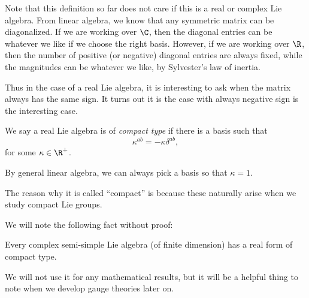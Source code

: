 \documentclass[a4paper]{article}
\begin{document}
%
%

Note that this definition so far does not care if this is a real or complex Lie algebra. From linear algebra, we know that any symmetric matrix can be diagonalized. If we are working over $\C$, then the diagonal entries can be whatever we like if we choose the right basis. However, if we are working over $\R$, then the number of positive (or negative) diagonal entries are always fixed, while the magnitudes can be whatever we like, by Sylvester's law of inertia.

Thus in the case of a real Lie algebra, it is interesting to ask when the matrix always has the same sign. It turns out it is the case with always negative sign is the interesting case.

\begin{defi}
  We say a real Lie algebra is of \emph{compact type} if there is a basis such that
  \[
    \kappa^{ab} = - \kappa \delta^{ab},
  \]
  for some $\kappa \in \R^+$.
\end{defi}
By general linear algebra, we can always pick a basis so that $\kappa = 1$.

The reason why it is called ``compact'' is because these naturally arise when we study compact Lie groups.

We will note the following fact without proof:
\begin{thm}
  Every complex semi-simple Lie algebra (of finite dimension) has a real form of compact type.
\end{thm}
We will not use it for any mathematical results, but it will be a helpful thing to note when we develop gauge theories later on.
\end{document}
